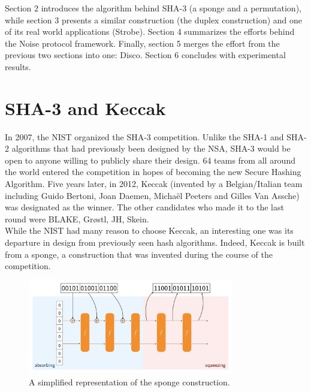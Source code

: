 \documentclass{article}
\begin{document}
Section 2 introduces the algorithm behind SHA-3 (a sponge and a permutation), while section 3 presents a similar construction (the duplex construction) and one of its real world applications (Strobe). Section 4 summarizes the efforts behind the Noise protocol framework. Finally, section 5 merges the effort from the previous two sections into one: Disco. Section 6 concludes with experimental results.

\section{SHA-3 and Keccak}

In 2007, the NIST organized the SHA-3 competition\cite{sha3}. Unlike the SHA-1 and SHA-2 algorithms that had previously been designed by the NSA, SHA-3 would be open to anyone willing to publicly share their design. 64 teams from all around the world entered the competition in hopes of becoming the new Secure Hashing Algorithm. Five years later, in 2012, Keccak (invented by a Belgian/Italian team including Guido Bertoni, Joan Daemen, Michaël Peeters and Gilles Van Assche) was designated as the winner\cite{fips202}. The other candidates who made it to the last round were BLAKE, Grøstl, JH, Skein.\\

While the NIST had many reason to choose Keccak, an interesting one was its departure in design from previously seen hash algorithms. Indeed, Keccak is built from a sponge, a construction that was invented during the course of the competition. 

\begin{figure}[H]
\centering
\includegraphics[width=0.8\textwidth]{rwcimg/sponge.png}
\caption{A simplified representation of the sponge construction.}
\label{fig:sponge}
\end{figure}
\end{document}
